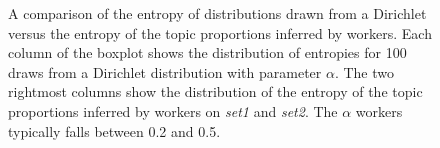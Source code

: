 \begin{figure}
\centering
{}%

\caption{A comparison of the entropy of distributions drawn from a
  Dirichlet versus the entropy of the topic proportions inferred by
  workers.  Each column of the boxplot shows the distribution of
  entropies for 100 draws from a Dirichlet distribution with parameter
  $\alpha$.  The two rightmost columns show the distribution of the
  entropy of the topic proportions inferred by workers on \emph{set1}
  and \emph{set2}.  The $\alpha$ workers typically falls between 0.2
  and 0.5.}

\label{fig:entropy}
\end{figure}

